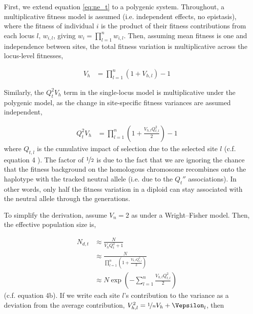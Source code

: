 \documentclass[11pt]{article}
\newcommand{\E}{\mathbb{E}}
\newcommand{\V}{\text{V}}
\newcommand{\V}{\text{V}}
\begin{document}
First, we extend equation \eqref{eq:ne_t} to a polygenic system. Throughout, a
multiplicative fitness model is assumed (i.e. independent effects, no
epistasis), where the fitness of individual $i$ is the product of their fitness
contributions from each locus $l$, $w_{i,l}$, giving $w_i = \prod_{l=1}^n
w_{i,l}$. Then, assuming mean fitness is one and independence between sites,
the total fitness variation is multiplicative across the locus-level fitnesses,

\begin{align}
  V_h %
      &= \prod_{l=1}^n (1 + V_{h,l})  - 1
\end{align}

Similarly, the $Q_t^2 V_h$ term in the single-locus model is multiplicative
under the polygenic model, as the change in site-specific fitness variances are
assumed independent,

\begin{align}
  Q_t^2 V_h &= \prod_{l=1}^n \left(1 + \frac{V_{h,l} Q_{t,l}^2}{2}\right)  - 1
\end{align}
%
where $Q_{t,l}$ is the cumulative impact of selection due to the selected site
$l$ (c.f. equation 4 \cite{Santiago1998-bs}). The factor of $\nicefrac{1}{2}$
is due to the fact that we are ignoring the chance that the fitness background
on the homologous chromosome recombines onto the haplotype with the tracked
neutral allele (i.e. due to the $Q_t''$ associations). In other words, only
half the fitness variation in a diploid can stay associated with the neutral
allele through the generations.

To simplify the derivation, assume $V_n = 2$ as under a Wright--Fisher model.
Then, the effective population size is,

\begin{align}
  N_{d,t} &\approx \frac{N}{V_h Q_t^2 + 1} \nonumber \\
          &\approx \frac{N}{\prod_{l=1}^n \left(1 + \frac{V_{h,l} Q_{t,l}^2}{2}\right)} \nonumber \\
          &\approx N \exp\left(- \sum_{l=1}^n \frac{V_{h,l} Q_{t,l}^2}{2}\right)
\end{align}
%
(c.f. \cite{Santiago1998-bs} equation 4b). If we write each site $l$'s
contribution to the variance as a deviation from the average contribution,
$V_{h,l}^2 = \nicefrac{1}{n} V_h + \Vepsilon_l$, then 
\end{document}
